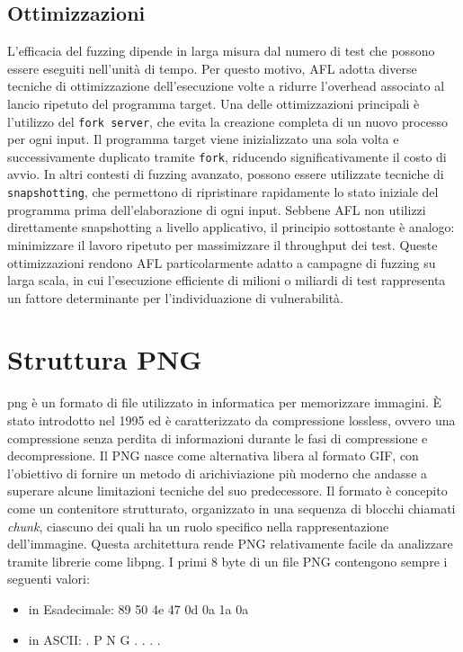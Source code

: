 \subsection{Ottimizzazioni}
L’efficacia del fuzzing dipende in larga misura dal numero di test che possono essere eseguiti nell’unità di tempo. Per questo motivo, AFL adotta diverse tecniche di ottimizzazione dell’esecuzione volte a ridurre l’overhead associato al lancio ripetuto del programma target.
Una delle ottimizzazioni principali è l’utilizzo del \texttt{fork server}, che evita la creazione completa di un nuovo processo per ogni input. Il programma target viene inizializzato una sola volta e successivamente duplicato tramite \texttt{fork}, riducendo significativamente il costo di avvio.
In altri contesti di fuzzing avanzato, possono essere utilizzate tecniche di \texttt{snapshotting}, che permettono di ripristinare rapidamente lo stato iniziale del programma prima dell’elaborazione di ogni input. Sebbene AFL non utilizzi direttamente snapshotting a livello applicativo, il principio sottostante è analogo: minimizzare il lavoro ripetuto per massimizzare il throughput dei test.
Queste ottimizzazioni rendono AFL particolarmente adatto a campagne di fuzzing su larga scala, in cui l’esecuzione efficiente di milioni o miliardi di test rappresenta un fattore determinante per l’individuazione di vulnerabilità.



\section{Struttura PNG}
\gls{png} è un formato di file utilizzato in informatica per memorizzare immagini. È stato introdotto nel 1995 ed è caratterizzato da compressione lossless, ovvero una compressione senza perdita di informazioni durante le fasi di compressione e decompressione.
Il PNG nasce come alternativa libera al formato GIF, con l'obiettivo di fornire un metodo di arichiviazione più moderno che andasse a superare alcune limitazioni tecniche del suo predecessore.
Il formato è concepito come un contenitore strutturato, organizzato in una sequenza di blocchi chiamati \textit{chunk}, ciascuno dei quali ha un ruolo specifico nella rappresentazione dell'immagine.
Questa architettura rende PNG relativamente facile da analizzare tramite librerie come libpng.
I primi 8 byte di un file PNG contengono sempre i seguenti valori:
\begin{itemize}
    \item in Esadecimale:           89  50  4e  47  0d  0a  1a  0a
    \item in ASCII:              .  P  N  G  .  .  .  .
\end{itemize}

